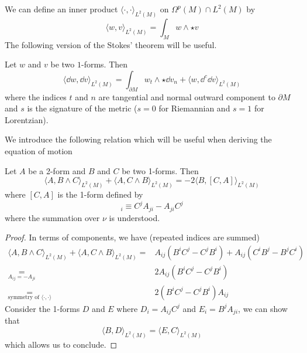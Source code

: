 %
We can define an inner product $\langle \cdot, \cdot \rangle_{L^2(M)}$ on $\Omega^p(M)\cap L^2(M)$ by
\begin{equation*}
\langle w, v \rangle_{L^2(M)} = \int_M w \wedge \star v
\end{equation*}
The following version of the Stokes' theorem will be useful.
\begin{proposition}
Let $w$ and $v$ be two $1$-forms. Then
\begin{equation}\label{ym-stokes}
\langle \dd w,  \dd v \rangle_{L^2(M)} =
\int_{\partial M} w_t\wedge \star \dd v_n  +
\langle w, \dd^c \dd v \rangle_{L^2(M)}
\end{equation}
where the indices $t$ and $n$ are tangential and normal outward component to $\partial M$ and $s$ is the signature of the metric ($s=0$ for Riemannian and $s = 1$ for Lorentzian).
\end{proposition}
%
We introduce the following relation which will be useful when deriving the equation of motion
\begin{proposition}\label{ym-wedge}
Let $A$ be a 2-form and $B$ and $C$ be two 1-forms. Then
\begin{equation}
\langle A, B\wedge C \rangle_{L^2(M)} + \langle A, C\wedge B \rangle_{L^2(M)} =
- 2 \langle B, [C, A] \rangle_{L^2(M)}
\end{equation}
where $[C, A]$ is the 1-form defined by
\begin{equation*}
[C, A]_{i} \equiv C^j A_{ji} - A_{ji}C^j
\end{equation*}
where the summation over $\nu$ is understood.
\end{proposition}
\begin{proof}
In terms of components, we have (repeated indices are summed)
\begin{equation*}
\begin{split}
\langle A, B\wedge C \rangle_{L^2(M)} + \langle A, C\wedge B \rangle_{L^2(M)} = & 
A_{ij}(B^i C^j - C^j B^i) + A_{ij}(C^i B^j - B^j C^i) \\
\underset{A_{ij} = -A_{ji}}{=} & 2 A_{ij}(B^i C^j - C^j B^i)\\
\underset{\textrm{symmetry of }\langle \cdot, \cdot \rangle}{ = } &2 (B^i C^j - C^j B^i)A_{ij}
\end{split}
\end{equation*}
Consider the 1-forms $D$ and $E$ where $D_i = A_{ij}C^j$ and $E_i = B^j A_{ji}$, we can show that 
\begin{equation*}
\langle B, D\rangle_{L^2{(M)}} = \langle E, C \rangle_{L^2(M)}
\end{equation*}
which allows us to conclude.
\end{proof}









